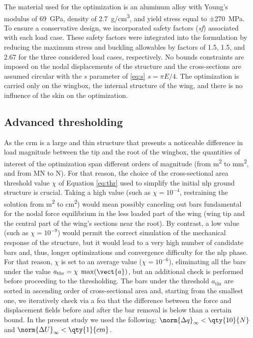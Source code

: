The material used for the optimization is an aluminum alloy with Young's modulus of \qty{69}{\GPa}, density of \qty{2.7}{\gram/\cm^3}, and yield stress equal to $\pm$\qty{270}{\MPa}. To ensure a conservative design, we incorporated safety factors (\textit{sf}) associated with each load case. These safety factors were integrated into the formulation by reducing the maximum stress and buckling allowables by factors of 1.5, 1.5, and 2.67 for the three considered load cases, respectively. No bounds constraints are imposed on the nodal displacements of the structure and the cross-sections are assumed circular with the $s$ parameter of \eqref{eq:s} $s = \pi E/4$. The optimization is carried only on the wingbox, the internal structure of the wing, and there is no influence of the skin on the optimization.

\subsection{Advanced thresholding}
As the \gls{crm} is a large and thin structure that presents a noticeable difference in load magnitude between the tip and the root of the wingbox, the quantities of interest of the optimization span different orders of magnitude (from \unit{m^2} to \unit{mm^2}, and from \unit{MN} to \unit{N}). For that reason, the choice of the cross-sectional area threshold value $\chi$ of Equation \eqref{eq:thr} used to simplify the initial \gls{nlp} ground structure is crucial. Taking a high value (such as $\chi = 10^{-4}$, restraining the solution from \unit{m^2} to \unit{cm^2}) would mean possibly canceling out bars fundamental for the nodal force equilibrium in the less loaded part of the wing (wing tip and the central part of the wing's sections near the root). By contrast, a low value (such as $\chi=10^{-9}$) would permit the correct simulation of the mechanical response of the structure, but it would lead to a very high number of candidate bars and, thus, longer optimizations and convergence difficulty for the \gls{nlp} phase. For that reason, $\chi$ is set to an average value ($\chi=10^{-6}$), eliminating all the bars under the value $a_{\text{thr}}=\chi \; \max(\vect{a})$, but an additional check is performed before proceeding to the thresholding. The bars under the threshold $a_{\text{thr}}$ are sorted in ascending order of cross-sectional area and, starting from the smallest one, we iteratively check via a \gls{fea} that the difference between the force and displacement fields before and after the bar removal is below than a certain bound. In the present study we used the following: $\norm{\Delta q}_{\infty}<\qty{10}{N}$ and $\norm{\Delta U}_{\infty}<\qty{1}{cm}$.

